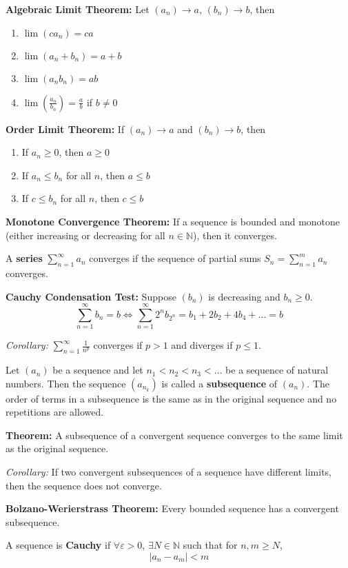 \documentclass[12pt]{article}
\newcommand{\N}{\mathbb{N}}
\newcommand{\abs}[1]{\left\vert #1 \right\vert}
\newcommand{\ep}{\varepsilon}
\begin{document}
\textbf{Algebraic Limit Theorem:} Let $(a_n) \to a$, $(b_n)\to b$, then 
\begin{enumerate}
    \item $\lim (ca_n) = ca$
    \item $\lim (a_n + b_n) = a + b$
    \item $\lim (a_n b_n) = ab$
    \item $\lim \left(\frac{a_n}{b_n}\right) = \frac{a}{b}$ if $b \neq 0$
\end{enumerate}

\textbf{Order Limit Theorem:} If $(a_n) \to a$ and $(b_n) \to b$, then
\begin{enumerate}
    \item If $a_n \geq 0$, then $a \geq 0$
    \item If $a_n \leq b_n$ for all $n$, then $a \leq b$
    \item If $c \leq b_n$ for all $n$, then $c \leq b$
\end{enumerate} 

\textbf{Monotone Convergence Theorem:} If a sequence is bounded and monotone (either increasing or decreasing for all $n \in \N$), then it converges.

A \textbf{series} $\sum_{n=1}^{\infty} a_n$ converges if the sequence of partial sums $S_n = \sum_{n=1}^m a_n$ converges.

\textbf{Cauchy Condensation Test:} Suppose $(b_n)$ is decreasing and $b_n \geq 0$.
\[\sum_{n=1}^{\infty} b_n = b \iff \sum_{n=1}^{\infty} 2^n b_{2^n} = b_1 + 2b_2 + 4b_4 + \dots = b\]

\emph{Corollary:} $\sum_{n=1}^{\infty} \frac{1}{n^p}$ converges if $p > 1$ and diverges if $p \leq 1$.

Let $(a_n)$ be a sequence and let $n_1 < n_2 < n_3 < \dots$ be a sequence of natural numbers. Then the sequence $(a_{n_k})$ is called a \textbf{subsequence} of $(a_n)$. The order of terms in a subsequence is the same as in the original sequence and no repetitions are allowed.

\textbf{Theorem:} A subsequence of a convergent sequence converges to the same limit as the original sequence.

\emph{Corollary:} If two convergent subsequences of a sequence have different limits, then the sequence does not converge.

\textbf{Bolzano-Werierstrass Theorem:} Every bounded sequence has a convergent subsequence.

A sequence is \textbf{Cauchy} if $\forall \ep > 0$, $\exists N \in \N$ such that for $n, m \geq N$, 
\[\abs{a_n - a_m} < m\] 
\end{document}
